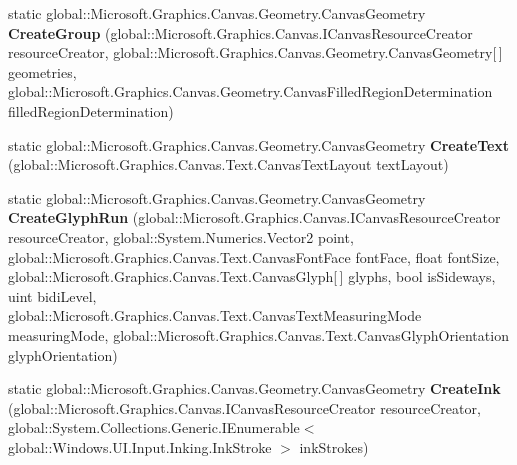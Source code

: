 \begin{DoxyCompactItemize}
\item 
\mbox{\label{class_microsoft_1_1_graphics_1_1_canvas_1_1_geometry_1_1_canvas_geometry_a1af065a42d2349de0898d7f63c2af94a}} 
static global\+::\+Microsoft.\+Graphics.\+Canvas.\+Geometry.\+Canvas\+Geometry {\bfseries Create\+Group} (global\+::\+Microsoft.\+Graphics.\+Canvas.\+I\+Canvas\+Resource\+Creator resource\+Creator, global\+::\+Microsoft.\+Graphics.\+Canvas.\+Geometry.\+Canvas\+Geometry\mbox{[}$\,$\mbox{]} geometries, global\+::\+Microsoft.\+Graphics.\+Canvas.\+Geometry.\+Canvas\+Filled\+Region\+Determination filled\+Region\+Determination)
\item 
\mbox{\label{class_microsoft_1_1_graphics_1_1_canvas_1_1_geometry_1_1_canvas_geometry_a5c956c37368cb565497e9e95f12918df}} 
static global\+::\+Microsoft.\+Graphics.\+Canvas.\+Geometry.\+Canvas\+Geometry {\bfseries Create\+Text} (global\+::\+Microsoft.\+Graphics.\+Canvas.\+Text.\+Canvas\+Text\+Layout text\+Layout)
\item 
\mbox{\label{class_microsoft_1_1_graphics_1_1_canvas_1_1_geometry_1_1_canvas_geometry_aac0a557b41812921ee04b4413f0fb8f1}} 
static global\+::\+Microsoft.\+Graphics.\+Canvas.\+Geometry.\+Canvas\+Geometry {\bfseries Create\+Glyph\+Run} (global\+::\+Microsoft.\+Graphics.\+Canvas.\+I\+Canvas\+Resource\+Creator resource\+Creator, global\+::\+System.\+Numerics.\+Vector2 point, global\+::\+Microsoft.\+Graphics.\+Canvas.\+Text.\+Canvas\+Font\+Face font\+Face, float font\+Size, global\+::\+Microsoft.\+Graphics.\+Canvas.\+Text.\+Canvas\+Glyph\mbox{[}$\,$\mbox{]} glyphs, bool is\+Sideways, uint bidi\+Level, global\+::\+Microsoft.\+Graphics.\+Canvas.\+Text.\+Canvas\+Text\+Measuring\+Mode measuring\+Mode, global\+::\+Microsoft.\+Graphics.\+Canvas.\+Text.\+Canvas\+Glyph\+Orientation glyph\+Orientation)
\item 
\mbox{\label{class_microsoft_1_1_graphics_1_1_canvas_1_1_geometry_1_1_canvas_geometry_a42466cc94da19392c5dd77f1fd235a67}} 
static global\+::\+Microsoft.\+Graphics.\+Canvas.\+Geometry.\+Canvas\+Geometry {\bfseries Create\+Ink} (global\+::\+Microsoft.\+Graphics.\+Canvas.\+I\+Canvas\+Resource\+Creator resource\+Creator, global\+::\+System.\+Collections.\+Generic.\+I\+Enumerable$<$ global\+::\+Windows.\+U\+I.\+Input.\+Inking.\+Ink\+Stroke $>$ ink\+Strokes)

\end{DoxyCompactItemize}
